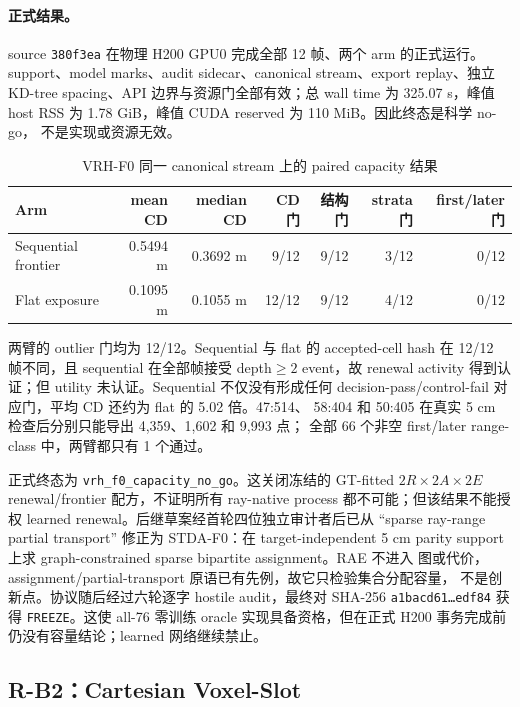 \documentclass[11pt,a4paper,fontset=none]{ctexart}
\newcommand{\code}[1]{\texttt{#1}}
\begin{document}
\paragraph{正式结果。}
source \code{380f3ea} 在物理 H200 GPU0 完成全部 12 帧、两个 arm 的正式运行。
support、model marks、audit sidecar、canonical stream、export replay、独立
KD-tree spacing、API 边界与资源门全部有效；总 wall time 为 325.07 s，峰值 host
RSS 为 1.78 GiB，峰值 CUDA reserved 为 110 MiB。因此终态是科学 no-go，
不是实现或资源无效。

\begin{table}[H]
\centering
\small
\caption{VRH-F0 同一 canonical stream 上的 paired capacity 结果}
\begin{tabular}{lrrrrrr}
\toprule
Arm & mean CD & median CD & CD 门 & 结构门 & strata 门 & first/later 门 \\
\midrule
Sequential frontier & 0.5494 m & 0.3692 m & 9/12 & 9/12 & 3/12 & 0/12 \\
Flat exposure & 0.1095 m & 0.1055 m & 12/12 & 9/12 & 4/12 & 0/12 \\
\bottomrule
\end{tabular}
\end{table}

两臂的 outlier 门均为 12/12。Sequential 与 flat 的 accepted-cell hash 在
12/12 帧不同，且 sequential 在全部帧接受 depth$\ge2$ event，故 renewal
activity 得到认证；但 utility 未认证。Sequential 不仅没有形成任何
decision-pass/control-fail 对应门，平均 CD 还约为 flat 的 5.02 倍。47:514、
58:404 和 50:405 在真实 5 cm 检查后分别只能导出 4,359、1,602 和 9,993 点；
全部 66 个非空 first/later range-class 中，两臂都只有 1 个通过。

正式终态为 \code{vrh\_f0\_capacity\_no\_go}。这关闭冻结的 GT-fitted
$2R\times2A\times2E$ renewal/frontier 配方，不证明所有 ray-native process
都不可能；但该结果不能授权 learned renewal。后继草案经首轮四位独立审计者后已从
``sparse ray-range partial transport'' 修正为 STDA-F0：在 target-independent
5 cm parity support 上求 graph-constrained sparse bipartite assignment。RAE 不进入
图或代价，assignment/partial-transport 原语已有先例，故它只检验集合分配容量，
不是创新点。协议随后经过六轮逐字 hostile audit，最终对 SHA-256
\code{a1bacd61\ldots edf84} 获得 \code{FREEZE}。这使 all-76 零训练 oracle
实现具备资格，但在正式 H200 事务完成前仍没有容量结论；learned 网络继续禁止。

\subsection{R-B2：Cartesian Voxel-Slot}
\end{document}
